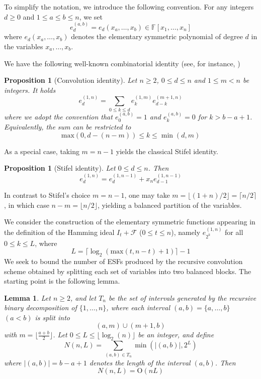 \documentclass{amsart}
\newtheorem{proposition}[theorem]{Proposition}
\newtheorem{lemma}[theorem]{Lemma}
\def\FF{{\mathbb F}}
\def\cF{{\mathcal{F}}}
\def\cO{{\mathrm{O}}}
\def\max{{\mathrm{max}}}
\begin{document}
To simplify the notation, we introduce the following convention. For any integers $d\geq 0$
and $1\leq a\leq b\leq n$, we set
\[
e_d^{(a,b)} = e_d(x_a,\ldots,x_b) \in \FF[x_1,\ldots,x_n]
\]
where $e_d(x_a,\ldots,x_b)$ denotes the elementary symmetric polynomial of degree $d$
in the variables $x_a,\ldots,x_b$.

We have the following well-known combinatorial identity (see, for instance, \cite{Ma})

\begin{proposition}[Convolution identity]
Let $n\geq 2$, $0\leq d\leq n$ and $1\leq m < n$ be integers. It holds
\[
e_d^{(1,n)} = \sum_{0\leq k\leq d} e_k^{(1,m)} e_{d-k}^{(m+1,n)}
\]
where we adopt the convention that $e_0^{(a,b)} = 1$ and $e_k^{(a,b)} = 0$ for $k > b-a+1$.
Equivalently, the sum can be restricted to
\[
\max(0,d-(n-m)) \leq k \leq \min(d,m)
\]
\end{proposition}

As a special case, taking $m = n - 1$ yields the classical Stifel identity.

\begin{proposition}[Stifel identity]
Let $0\leq d\leq n$. Then
\[
e_d^{(1,n)} = e_d^{(1,n-1)} + x_n e_{d-1}^{(1,n-1)}
\]
\end{proposition}

In contrast to Stifel’s choice $m = n - 1$, one may take $m = \lfloor (1+n)/2 \rfloor =
\lceil n/2 \rceil$, in which case $n - m = \lfloor n/2 \rfloor$, yielding a balanced
partition of the variables.

We consider the construction of the elementary symmetric functions appearing in the definition
of the Hamming ideal $I_t + \cF$ ($0\leq t\leq n$), namely $e_{2^k}^{(1,n)}$ for all $0\leq k\leq L$,
where
\[
L = \lceil \log_2( \max(t,n-t)+1 ) \rceil - 1
\]
We seek to bound the number of ESFs produced by the recursive convolution scheme
obtained by splitting each set of variables into two balanced blocks. The starting point
is the following lemma.

\begin{lemma}
\label{lemma2}
Let $n\geq 2$, and let $T_n$ be the set of intervals generated by the recursive binary
decomposition of $\{1,\ldots,n\}$, where each interval $(a,b) = \{a,\ldots,b\}$ $(a < b)$
is split into
\[
(a,m)\cup (m+1,b)
\]
with $m = \lfloor \frac{a+b}{2} \rfloor$. Let $0\leq L\leq \lfloor \log_2(n) \rfloor$
be an integer, and define
\[
N(n,L) = \sum_{(a,b)\in T_n} \min(|(a,b)|,2^L)
\]
where $|(a,b)| = b-a+1$ denotes the length of the interval $(a,b)$. Then
\[
N(n,L) = \cO(n L)
\]
\end{lemma}
\end{document}
